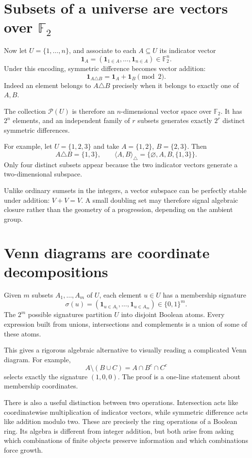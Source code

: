 \section[Subsets as vectors over F2]{Subsets of a universe are vectors over \(\mathbb F_2\)}

Now let \(U=\{1,\ldots,n\}\), and associate to each \(A\subseteq U\) its indicator vector
\[
 \mathbf1_A=(\mathbf1_{1\in A},\ldots,\mathbf1_{n\in A})\in\mathbb F_2^n.
\]
Under this encoding, symmetric difference becomes vector addition:
\[
 \mathbf1_{A\triangle B}=\mathbf1_A+\mathbf1_B\pmod2.
\]
Indeed an element belongs to \(A\triangle B\) precisely when it belongs to exactly one of \(A,B\).

The collection \(\mathcal P(U)\) is therefore an \(n\)-dimensional vector space over \(\mathbb F_2\). It has \(2^n\) elements, and an independent family of \(r\) subsets generates exactly \(2^r\) distinct symmetric differences.

For example, let \(U=\{1,2,3\}\) and take \(A=\{1,2\}\), \(B=\{2,3\}\). Then
\[
 A\triangle B=\{1,3\},\qquad
 \langle A,B\rangle_{\triangle}
   =\{\varnothing,A,B,\{1,3\}\}.
\]
Only four distinct subsets appear because the two indicator vectors generate a two-dimensional subspace.

Unlike ordinary sumsets in the integers, a vector subspace can be perfectly stable under addition: \(V+V=V\). A small doubling set may therefore signal algebraic closure rather than the geometry of a progression, depending on the ambient group.

\section{Venn diagrams are coordinate decompositions}

Given \(m\) subsets \(A_1,\ldots,A_m\) of \(U\), each element \(u\in U\) has a membership signature
\[
 \sigma(u)=(\mathbf1_{u\in A_1},\ldots,\mathbf1_{u\in A_m})
 \in\{0,1\}^m.
\]
The \(2^m\) possible signatures partition \(U\) into disjoint Boolean atoms. Every expression built from unions, intersections and complements is a union of some of these atoms.

This gives a rigorous algebraic alternative to visually reading a complicated Venn diagram. For example,
\[
 A\setminus(B\cup C)=A\cap B^c\cap C^c
\]
selects exactly the signature \((1,0,0)\). The proof is a one-line statement about membership coordinates.

There is also a useful distinction between two operations. Intersection acts like coordinatewise multiplication of indicator vectors, while symmetric difference acts like addition modulo two. These are precisely the ring operations of a Boolean ring. Its algebra is different from integer addition, but both arise from asking which combinations of finite objects preserve information and which combinations force growth.
